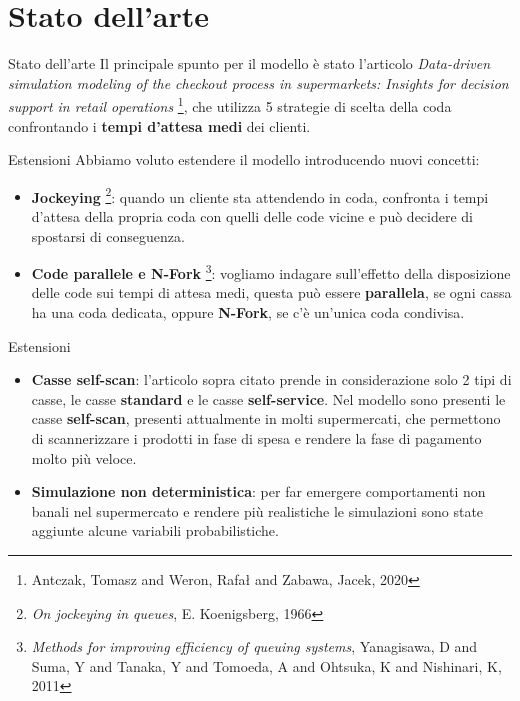 \section{Stato dell'arte}
\begin{frame}{Stato dell'arte}
	Il principale spunto per il modello è stato l'articolo \textit{Data-driven simulation modeling of the checkout process in supermarkets: Insights for decision support in retail operations} \footnote{Antczak, Tomasz and Weron, Rafał and Zabawa, Jacek, 2020}, che utilizza 5 strategie di scelta della coda confrontando i \textbf{tempi d'attesa medi} dei clienti.
\end{frame}

\begin{frame}{Estensioni}
	Abbiamo voluto estendere il modello introducendo nuovi concetti:
	
	\begin{itemize}
		\item \textbf{Jockeying} \footnote{\textit{On jockeying in queues}, E. Koenigsberg, 1966}: quando un cliente sta attendendo in coda, confronta i tempi d'attesa della propria coda con quelli delle code vicine e può decidere di spostarsi di conseguenza.
		\item \textbf{Code parallele e N-Fork} \footnote{\textit{Methods for improving efficiency of queuing systems}, Yanagisawa, D and Suma, Y and Tanaka, Y and Tomoeda, A and Ohtsuka, K and Nishinari, K, 2011}: vogliamo indagare sull'effetto della disposizione delle code sui tempi di attesa medi, questa può essere \textbf{parallela}, se ogni cassa ha una coda dedicata, oppure \textbf{N-Fork}, se c'è un'unica coda condivisa.
	\end{itemize}
\end{frame}

\begin{frame}{Estensioni}
	\begin{itemize}
		\item \textbf{Casse self-scan}: l'articolo sopra citato prende in considerazione solo 2 tipi di casse, le casse \textbf{standard} e le casse \textbf{self-service}. Nel modello sono presenti le casse \textbf{self-scan}, presenti attualmente in molti supermercati, che permettono di scannerizzare i prodotti in fase di spesa e rendere la fase di pagamento molto più veloce.
		\item \textbf{Simulazione non deterministica}: per far emergere comportamenti non banali nel supermercato e rendere più realistiche le simulazioni sono state aggiunte alcune variabili probabilistiche.
	\end{itemize}
\end{frame}